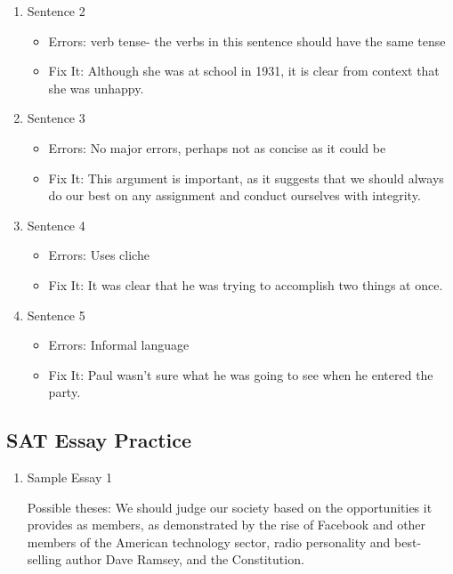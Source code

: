 \begin{enumerate}
\begin{enumerate}
\item Sentence 2

\begin{itemize}
\item Errors: verb tense- the verbs in this sentence should have the same tense
\item Fix It: Although she was at school in 1931, it is clear from context that she was unhappy. 
\end{itemize}

\item Sentence 3

\begin{itemize}
\item Errors: No major errors, perhaps not as concise as it could be
\item Fix It: This argument is important, as it suggests that we should always do our best on any assignment and conduct ourselves with integrity. 
\end{itemize}

\item Sentence 4

\begin{itemize}
\item Errors: Uses cliche
\item Fix It: It was clear that he was trying to accomplish two things at once. 
\end{itemize}

\item Sentence 5

\begin{itemize}
\item Errors: Informal language
\item Fix It: Paul wasn't sure what he was going to see when he entered the party. 
\end{itemize}

\end{enumerate}

\subsection{SAT Essay Practice}

\begin{enumerate}
\item Sample Essay 1

Possible theses: We should judge our society based on the opportunities it provides as members, as demonstrated by the rise of Facebook and other members of the American technology sector, radio personality and best-selling author Dave Ramsey, and the Constitution. 


\end{enumerate}
\end{enumerate}
